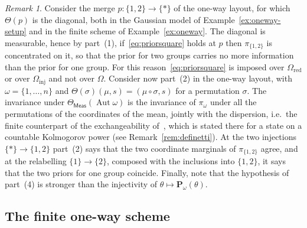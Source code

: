 \documentclass[11pt,a4paper]{article}
\theoremstyle{plain}
\theoremstyle{definition}
\theoremstyle{remark}
\newtheorem{remark}[theorem]{Remark}
\newcommand{\cat}[1]{\mathsf{#1}}
\newcommand{\catO}{\cat{\Omega}}
\newcommand{\Meas}{\cat{Meas}}
\begin{document}
\begin{remark}\label{rem:coherence}
Consider the merge $p \colon \{1,2\} \to \{*\}$ of the one-way layout, for
which $\Theta(p)$ is the diagonal, both in the Gaussian model of
Example~\ref{ex:oneway-setup} and in the finite scheme of
Example~\ref{ex:oneway}. The diagonal is measurable, hence by part~(1),
if~\eqref{eq:priorsquare} holds at $p$ then $\pi_{\{1,2\}}$ is concentrated
on it, so that the prior for two groups carries no more information than the
prior for one group. For this reason~\eqref{eq:priorsquare} is imposed over
$\catO_{\mathrm{red}}$ or over $\catO_{\mathrm{inj}}$ and not over $\catO$.
Consider now part~(2) in the one-way layout, with $\omega = \{1,\dots,n\}$ and
$\Theta(\sigma)(\mu,s) = (\mu\circ\sigma, s)$ for a permutation $\sigma$. The
invariance under $\Theta_\Meas(\operatorname{Aut}\omega)$ is the invariance of
$\pi_{\omega}$ under all the permutations of the coordinates of the mean,
jointly with the dispersion, i.e.\ the finite counterpart of the
exchangeability of~\cite[Def.~4.1]{fritz_definetti_2021}, which is stated
there for a state on a countable Kolmogorov power (see
Remark~\ref{rem:definetti}). At the two injections
$\{*\} \to \{1,2\}$ part~(2) says that the two coordinate marginals of
$\pi_{\{1,2\}}$ agree, and at the relabelling $\{1\} \to \{2\}$, composed with
the inclusions into $\{1,2\}$, it says that the two priors for one group
coincide. Finally, note that the hypothesis of part~(4) is stronger than the
injectivity of $\theta \mapsto \mathbf P_{\omega}(\theta)$.
\end{remark}

\subsection{The finite one-way scheme}
\end{document}
